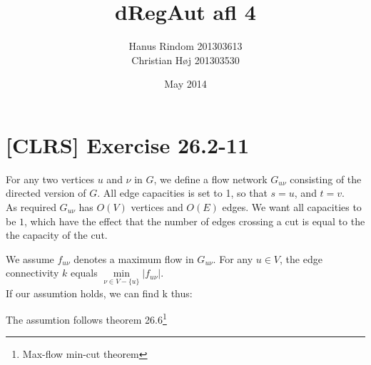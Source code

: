 \documentclass{article}
\title{dRegAut afl 4}
\author{Hanus Rindom 201303613\\
        Christian Høj 201303530}
\date{May 2014}
\begin{document}
\maketitle

\section*{[CLRS] Exercise 26.2-11}
For any two vertices $ u $ and $ \nu $ in $ G $, we define a flow network $ G_{u \nu} $ consisting of the directed version of $ G $.  All edge capacities is set to 1, so that $ s = u $, and $ t = v $.\\
As required $ G_{u \nu}  $ has $ O(V) $ vertices and $ O(E) $ edges. We want all capacities to be $ 1 $, which have the effect that the number of edges crossing a cut is equal to the the capacity of the cut.

We assume $ f_{u \nu} $ denotes a maximum flow in $ G_{u \nu} $.
For any $ u \in V $, the edge connectivity $ k $ equals $ \min\limits_{ \nu \in V-\{u\}}  |f_{u \nu }| $.\\
If our assumtion holds, we can find k thus:



The assumtion follows theorem 26.6\footnote{Max-flow min-cut theorem}
\end{document}
